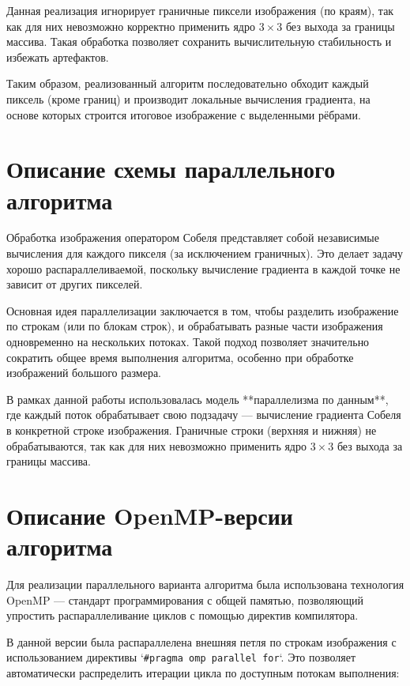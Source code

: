 \documentclass[14pt,a4paper]{extarticle}
\begin{document}
Данная реализация игнорирует граничные пиксели изображения (по краям), так как для них невозможно корректно применить ядро $3 \times 3$ без выхода за границы массива. 
Такая обработка позволяет сохранить вычислительную стабильность и избежать артефактов.

Таким образом, реализованный алгоритм последовательно обходит каждый пиксель (кроме границ) и производит локальные вычисления градиента, 
на основе которых строится итоговое изображение с выделенными рёбрами.

\section{Описание схемы параллельного алгоритма}

Обработка изображения оператором Собеля представляет собой независимые вычисления для каждого пикселя (за исключением граничных). Это делает задачу хорошо распараллеливаемой, 
поскольку вычисление градиента в каждой точке не зависит от других пикселей.

Основная идея параллелизации заключается в том, чтобы разделить изображение по строкам (или по блокам строк), и обрабатывать разные части изображения одновременно на нескольких потоках. 
Такой подход позволяет значительно сократить общее время выполнения алгоритма, особенно при обработке изображений большого размера.

В рамках данной работы использовалась модель **параллелизма по данным**, где каждый поток обрабатывает свою подзадачу — вычисление градиента Собеля в конкретной строке изображения. 
Граничные строки (верхняя и нижняя) не обрабатываются, так как для них невозможно применить ядро $3 \times 3$ без выхода за границы массива.

\section{Описание OpenMP-версии алгоритма}

Для реализации параллельного варианта алгоритма была использована технология OpenMP — стандарт программирования с общей памятью, 
позволяющий упростить распараллеливание циклов с помощью директив компилятора.

В данной версии была распараллелена внешняя петля по строкам изображения с использованием директивы `\texttt{\#pragma omp parallel for}`. 
Это позволяет автоматически распределить итерации цикла по доступным потокам выполнения:
\end{document}
